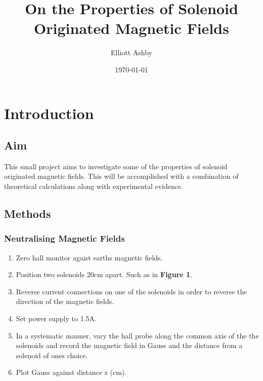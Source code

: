 \documentclass{article}
\title{On the Properties of Solenoid Originated Magnetic Fields} %
\author{Elliott Ashby}
\date{\today}
\begin{document}
    \maketitle
    
    \section{Introduction}
    
    \subsection{Aim}
    This small project aims to investigate some of the properties of 
    solenoid originated magnetic fields. 
    \newline This will be accomplished with a combination of theoretical 
    calculations along with experimental evidence.
    \subsection{Methods}
    \subsubsection{Neutralising Magnetic Fields}
    \begin{enumerate}
        \item Zero hall monitor agaist earths magnetic fields.
        \item Position two solenoids 20cm apart. Such as in \textbf{Figure 1}.
        \item Reverse current connections on one of the solenoids in order to reverse the direction of the magnetic fields.
        \item Set power supply to 1.5A.
        \item In a systematic manner, vary the hall probe along the common axis of the the solenoids and record the magnetic field in Gauss and the distance from a solenoid of ones choice.
        \item Plot Gauss against distance z (cm).
    \end{enumerate}
\end{document}
